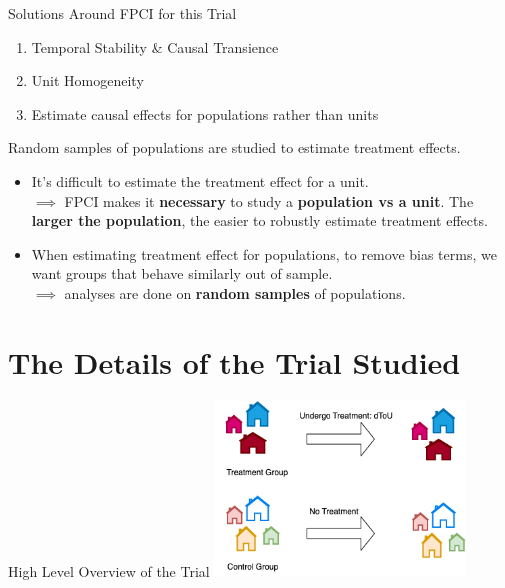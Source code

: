 \documentclass{beamer}
\begin{document}
\begin{frame}{Solutions Around FPCI for this Trial}
  \begin{enumerate}
    \item Temporal Stability \& Causal Transience {\color{red}{X}}
    \item Unit Homogeneity {\color{red}{X}}
    \item Estimate causal effects for populations rather than units {\color{green}{\checkmark}}
  \end{enumerate}
\end{frame}

\begin{frame}{Random samples of populations are studied to estimate treatment effects.}
  \begin{itemize}
    \item<+-> It's difficult to estimate the treatment effect for a unit. \\
    \indent $\implies$ FPCI makes it \textbf{necessary} to study a \textbf{population vs a unit}. The \textbf{larger the population}, the easier to robustly estimate treatment effects.
    \item<+-> When estimating treatment effect for populations, to remove bias terms, we want groups that behave similarly out of sample. \\
    \indent $\implies$ analyses are done on \textbf{random samples} of populations.
  \end{itemize}
\end{frame}


\section{The Details of the Trial Studied}

\begin{frame}{High Level Overview of the Trial}
  \centering
  \includegraphics[width=0.5\textwidth]{images/trial-high-level.png}
\end{frame}
\end{document}
